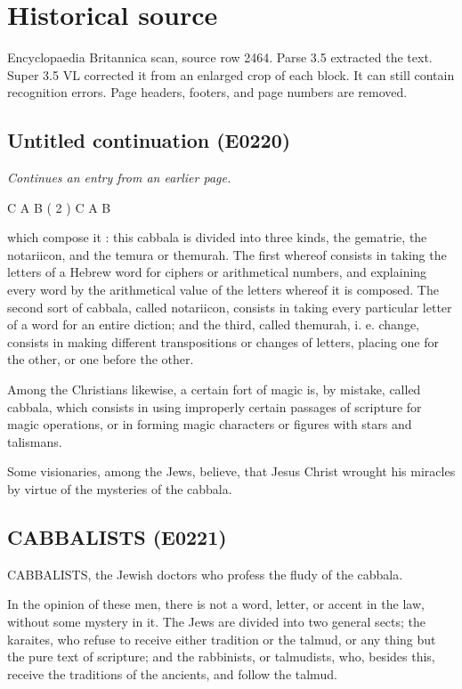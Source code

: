 \documentclass{article}
\begin{document}
\section*{Historical source}
Encyclopaedia Britannica scan, source row 2464. Parse 3.5 extracted the text. Super 3.5 VL corrected it from an enlarged crop of each block. It can still contain recognition errors.
Page headers, footers, and page numbers are removed.

\subsection*{Untitled continuation (E0220)}
\textit{Continues an entry from an earlier page.}

C A B ( 2 ) C A B

which compose it : this cabbala is divided into three kinds, the gematrie, the notariicon, and the temura or themurah. The first whereof consists in taking the letters of a Hebrew word for ciphers or arithmetical numbers, and explaining every word by the arithmetical value of the letters whereof it is composed. The second sort of cabbala, called notariicon, consists in taking every particular letter of a word for an entire diction; and the third, called themurah, i. e. change, consists in making different transpositions or changes of letters, placing one for the other, or one before the other.

Among the Christians likewise, a certain fort of magic is, by mistake, called cabbala, which consists in using improperly certain passages of scripture for magic operations, or in forming magic characters or figures with stars and talismans.

Some visionaries, among the Jews, believe, that Jesus Christ wrought his miracles by virtue of the mysteries of the cabbala.

\subsection*{CABBALISTS (E0221)}
CABBALISTS, the Jewish doctors who profess the fludy of the cabbala.

In the opinion of these men, there is not a word, letter, or accent in the law, without some mystery in it. The Jews are divided into two general sects; the karaites, who refuse to receive either tradition or the talmud, or any thing but the pure text of scripture; and the rabbinists, or talmudists, who, besides this, receive the traditions of the ancients, and follow the talmud.
\end{document}

